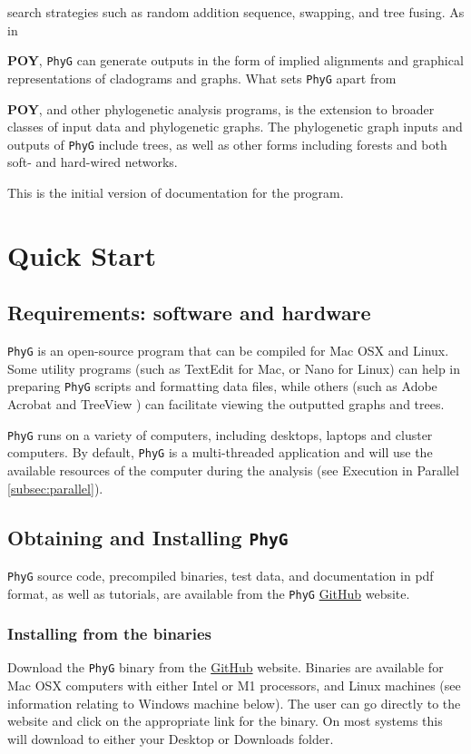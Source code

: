 \documentclass[11pt]{book}
\newcommand{\phyg}{\texttt{PhyG} }
\begin{document}
	search strategies such as random addition sequence, swapping, and tree fusing. As in {\textbf{POY}, 
	\phyg can generate outputs in the form of implied alignments and graphical representations of 
	cladograms and graphs. What sets \phyg apart from {\textbf{POY}, and other phylogenetic 
	analysis programs, is the extension to broader classes of input data and phylogenetic graphs. 
	The phylogenetic graph inputs and outputs of \texttt{PhyG} include trees, as well as other forms 
	including forests and both soft- and hard-wired networks.
		
	This is the initial version of documentation for the program.

	\section{Quick Start}
	
		\subsection{Requirements: software and hardware}
		\phyg is an open-source program that can be compiled for Mac OSX and Linux. Some 
		utility programs (such as TextEdit for Mac, or Nano for Linux) can help in preparing 
		\phyg scripts and formatting data files, while others (such as Adobe Acrobat and TreeView 
		\citep{page1996}) can facilitate viewing the outputted graphs and trees.
		
		\phyg runs on a variety of computers, including desktops, laptops and cluster computers.
		By default, \phyg is a multi-threaded application and will use the available resources of 
		the computer during the analysis (see Execution in Parallel \ref{subsec:parallel}). 
		
		\subsection{Obtaining and Installing \phyg}
		\phyg source code, precompiled binaries, test data, and documentation in pdf format, 
		as well as tutorials, are available from the \phyg \href{https://github.com/amnh/PhyGraph}{GitHub} 
		website.

		\subsubsection{Installing from the binaries}
		Download the \phyg binary from the \href{https://github.com/amnh/PhyGraph}{GitHub} 
		website. Binaries are available for Mac OSX computers with either Intel or M1 processors, 
		and Linux machines (see information relating to Windows machine below).
		The user can go directly to the website and click on the appropriate link 
		for the binary. On most systems this will download to either your Desktop or Downloads folder. \\
		
}}
\end{document}
